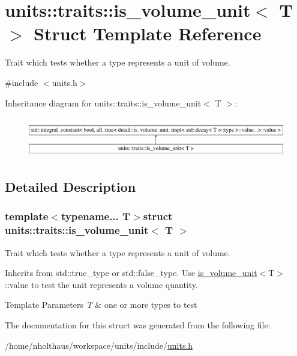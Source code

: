 \hypertarget{structunits_1_1traits_1_1is__volume__unit}{}\section{units\+:\+:traits\+:\+:is\+\_\+volume\+\_\+unit$<$ T $>$ Struct Template Reference}
\label{structunits_1_1traits_1_1is__volume__unit}


Trait which tests whether a type represents a unit of volume.  




{\ttfamily \#include $<$units.\+h$>$}

Inheritance diagram for units\+:\+:traits\+:\+:is\+\_\+volume\+\_\+unit$<$ T $>$\+:\begin{figure}[H]
\begin{center}
\leavevmode
\includegraphics[height=1.772152cm]{structunits_1_1traits_1_1is__volume__unit}
\end{center}
\end{figure}


\subsection{Detailed Description}
\subsubsection*{template$<$typename... T$>$struct units\+::traits\+::is\+\_\+volume\+\_\+unit$<$ T $>$}

Trait which tests whether a type represents a unit of volume. 

Inherits from {\ttfamily std\+::true\+\_\+type} or {\ttfamily std\+::false\+\_\+type}. Use {\ttfamily \hyperlink{structunits_1_1traits_1_1is__volume__unit}{is\+\_\+volume\+\_\+unit}$<$T$>$\+::value} to test the unit represents a volume quantity. 
\begin{DoxyTemplParams}{Template Parameters}
{\em T} & one or more types to test \\
\hline
\end{DoxyTemplParams}


The documentation for this struct was generated from the following file\+:\begin{DoxyCompactItemize}
\item 
/home/nholthaus/workspace/units/include/\hyperlink{units_8h}{units.\+h}\end{DoxyCompactItemize}
